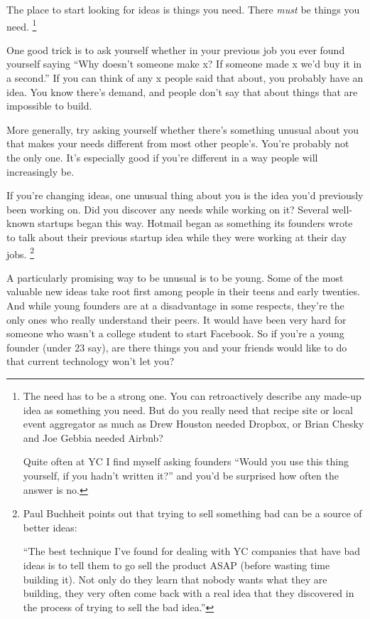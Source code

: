 The place to start looking for ideas is things you need. There
\emph{must} be things you need. \footnote{The need has to be a strong one. You can retroactively describe
any made-up idea as something you need. But do you really need that
recipe site or local event aggregator as much as Drew Houston needed
Dropbox, or Brian Chesky and Joe Gebbia needed Airbnb?

Quite often at YC I find myself asking founders ``Would you use this
thing yourself, if you hadn't written it?'' and you'd be surprised how
often the answer is no.}

One good trick is to ask yourself whether in your previous job you ever
found yourself saying ``Why doesn't someone make x? If someone made x
we'd buy it in a second.'' If you can think of any x people said that
about, you probably have an idea. You know there's demand, and people
don't say that about things that are impossible to build.

More generally, try asking yourself whether there's something unusual
about you that makes your needs different from most other people's.
You're probably not the only one. It's especially good if you're
different in a way people will increasingly be.

If you're changing ideas, one unusual thing about you is the idea you'd
previously been working on. Did you discover any needs while working on
it? Several well-known startups began this way. Hotmail began as
something its founders wrote to talk about their previous startup idea
while they were working at their day jobs. \footnote{Paul Buchheit points out that trying to sell something bad can
be a source of better ideas:

``The best technique I've found for dealing with YC companies that have
bad ideas is to tell them to go sell the product ASAP (before wasting
time building it). Not only do they learn that nobody wants what they
are building, they very often come back with a real idea that they
discovered in the process of trying to sell the bad idea.''}

A particularly promising way to be unusual is to be young. Some of the
most valuable new ideas take root first among people in their teens and
early twenties. And while young founders are at a disadvantage in some
respects, they're the only ones who really understand their peers. It
would have been very hard for someone who wasn't a college student to
start Facebook. So if you're a young founder (under 23 say), are there
things you and your friends would like to do that current technology
won't let you?


